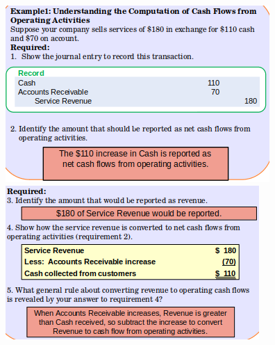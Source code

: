 \documentclass[../main.tex]{subfiles}
\begin{document}
	\begin{figure}[ht]
		\centering
		\includegraphics[width=0.9\columnwidth]{images/c11/cash_flows_eg1_p1.png}
		\includegraphics[width=0.85\columnwidth]{images/c11/cash_flows_eg1_p2.png}
	\end{figure}
\end{document}
